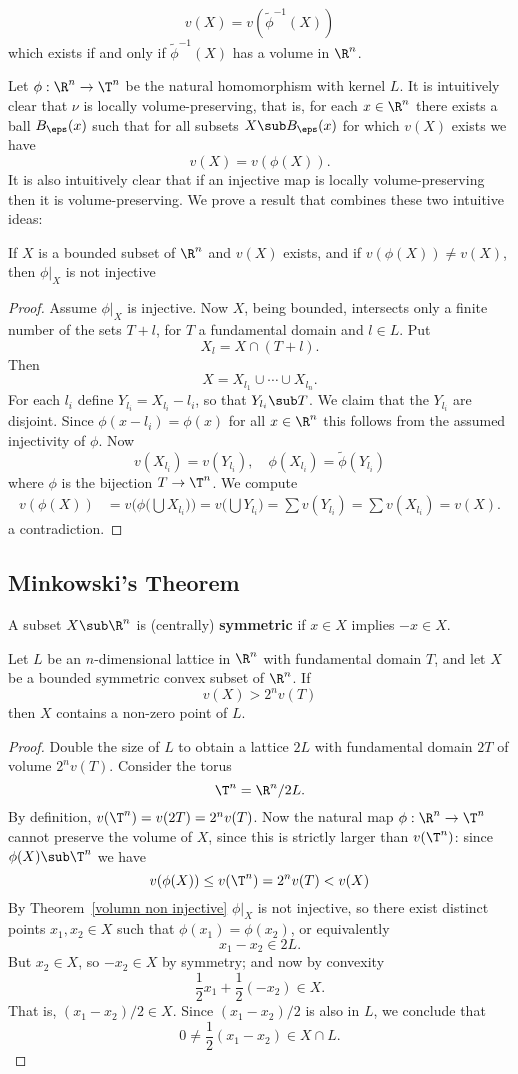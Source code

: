 \[v(X)=v(\widetilde{\phi}^{-1}(X))\]
which exists if and only if $\widetilde{\phi}^{-1}(X)$ has a volume in $\R^n$.\par
Let $\phi:\R^n\to\T^n$ be the natural homomorphism with kernel $L$. It is intuitively clear that $\nu$ is locally volume-preserving, that is, for each $x\in\R^n$ there exists a ball $B_\eps(x)$ such that for all subsets $X\sub B_\eps(x)$ for which $v(X)$ exists we have 
\[v(X)=v(\phi(X)).\]
It is also intuitively clear that if an injective map is locally volume-preserving then it is volume-preserving. We prove a result that combines these two intuitive ideas:
\begin{theorem}\label{volumn non injective}
If $X$ is a bounded subset of $\R^n$ and $v(X)$ exists, and if $v(\phi(X))\neq v(X)$, then $\phi|_X$ is not injective
\end{theorem}
\begin{proof}
Assume $\phi|_X$ is injective. Now $X$, being bounded, intersects only a finite number of the sets $T+l$, for $T$ a fundamental domain and $l\in L$. Put
\[X_l=X\cap(T+l).\]
Then 
\[X=X_{l_1}\cup\cdots\cup X_{l_n}.\]
For each $l_i$ define $Y_{l_i}=X_{l_i}-l_i$, so that $Y_{l_i}\sub T$. We claim that the $Y_{l_i}$ are disjoint. Since $\phi(x-l_i)=\phi(x)$ for all $x\in\R^n$ this follows from the assumed injectivity of $\phi$. Now 
\[v(X_{l_i})=v(Y_{l_i}),\quad \phi(X_{l_i})=\widetilde{\phi}(Y_{l_i})\]
where $\phi$ is the bijection $T\to\T^n$. We compute
\begin{align*}
v(\phi(X))&=v\Big(\phi\Big(\bigcup X_{l_i}\Big)\Big)=v\Big(\bigcup Y_{l_i}\Big)=\sum v(Y_{l_i})=\sum v(X_{l_i})=v(X).
\end{align*}
a contradiction.
\end{proof}
\subsection{Minkowski's Theorem}
A subset $X\sub\R^n$ is (centrally) \textbf{symmetric} if $x\in X$ implies $-x\in X$.
\begin{theorem}
Let $L$ be an $n$-dimensional lattice in $\R^n$ with fundamental domain $T$, and let $X$ be a bounded symmetric convex subset of $\R^n$. If
\[v(X)>2^nv(T)\]
then $X$ contains a non-zero point of $L$.
\end{theorem}
\begin{proof}
Double the size of $L$ to obtain a lattice $2L$ with fundamental domain $2T$ of volume $2^nv(T)$. Consider the torus
\[\T^n=\R^n/2L.\]
By definition, $v(\T^n)=v(2T)=2^nv(T)$. Now the natural map $\phi:\R^n\to\T^n$ cannot preserve the volume of $X$, since this is strictly larger than $v(\T^n)$: since $\phi(X)\sub\T^n$ we have
\[v(\phi(X))\leq v(\T^n)=2^nv(T)<v(X)\]
By Theorem~\ref{volumn non injective} $\phi|_X$ is not injective, so there exist distinct points $x_1,x_2\in X$ such that $\phi(x_1)=\phi(x_2)$, or equivalently
\[x_1-x_2\in 2L.\]
But $x_2\in X$, so $-x_2\in X$ by symmetry; and now by convexity
\[\frac{1}{2}x_1+\frac{1}{2}(-x_2)\in X.\]
That is, $(x_1-x_2)/2\in X$. Since $(x_1-x_2)/2$ is also in $L$, we conclude that
\[0\neq\frac{1}{2}(x_1-x_2)\in X\cap L.\]
\end{proof}
